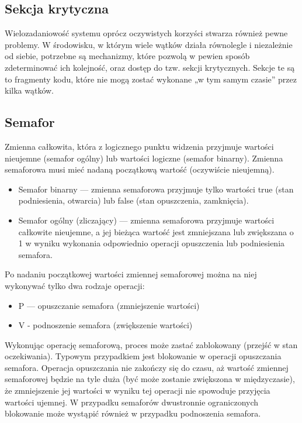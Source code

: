 \documentclass[main.tex]{subfiles}
\begin{document}
    \subsection{Sekcja krytyczna}
    Wielozadaniowość systemu oprócz oczywistych korzyści stwarza również pewne problemy. W środowisku, w którym wiele wątków działa równolegle i niezależnie od siebie, potrzebne są mechanizmy, które pozwolą w pewien sposób zdeterminować ich kolejność, oraz dostęp do tzw. sekcji krytycznych. Sekcje te są to fragmenty kodu, które nie mogą zostać wykonane „w tym samym czasie” przez kilka wątków.


    \subsection{Semafor}
    Zmienna całkowita, która z logicznego punktu widzenia przyjmuje wartości nieujemne (semafor ogólny) lub wartości logiczne (semafor binarny). Zmienna semaforowa musi mieć nadaną początkową wartość (oczywiście nieujemną).

    \begin{itemize}
        \item Semafor binarny — zmienna semaforowa przyjmuje tylko wartości true (stan podniesienia, otwarcia) lub false (stan opuszczenia, zamknięcia).
        \item Semafor ogólny (zliczający) — zmienna semaforowa przyjmuje wartości całkowite nieujemne, a jej bieżąca wartość jest zmniejszana lub zwiększana o 1 w wyniku wykonania odpowiednio operacji opuszczenia lub podniesienia semafora.
    \end{itemize}

    Po nadaniu początkowej wartości zmiennej semaforowej można na niej wykonywać tylko dwa rodzaje operacji:

    \begin{itemize}
        \item P — opuszczanie semafora (zmniejszenie wartości)
        \item V - podnoszenie semafora (zwiększenie wartości)
    \end{itemize}

    Wykonując operację semaforową, proces może zastać zablokowany (przejść w stan oczekiwania). Typowym przypadkiem jest blokowanie w operacji opuszczania semafora. Operacja opuszczania nie zakończy się do czasu, aż wartość zmiennej semaforowej będzie na tyle duża (być może zostanie zwiększona w międzyczasie), że zmniejszenie jej wartości w wyniku tej operacji nie spowoduje przyjęcia wartości ujemnej. W przypadku semaforów dwustronnie ograniczonych blokowanie może wystąpić również w przypadku podnoszenia semafora.
\end{document}
